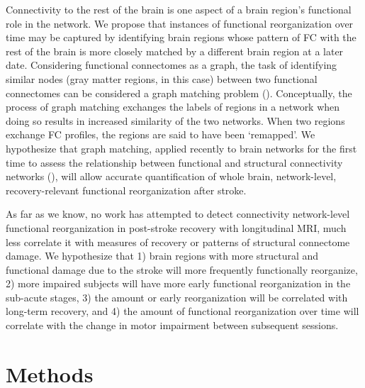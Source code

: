 \documentclass[phd,tocprelim]{cornell}
\begin{document}
	Connectivity to the rest of the brain is one aspect of a brain region's functional role in the network. We propose that instances of functional reorganization over time may be captured by identifying brain regions whose pattern of FC with the rest of the brain is more closely matched by a different brain region at a later date. Considering functional connectomes as a graph, the task of identifying similar nodes (gray matter regions, in this case) between two functional connectomes can be considered a graph matching problem (\cite{Conte2004-ro}). Conceptually, the process of graph matching exchanges the labels of regions in a network when doing so results in increased similarity of the two networks. When two regions exchange FC profiles, the regions are said to have been ‘remapped’. We hypothesize that graph matching, applied recently to brain networks for the first time to assess the relationship between functional and structural connectivity networks (\cite{Osmanlioglu2019-ao}), will allow accurate quantification of whole brain, network-level, recovery-relevant functional reorganization after stroke. 	
	
	As far as we know, no work has attempted to detect connectivity network-level functional reorganization in post-stroke recovery with longitudinal MRI, much less correlate it with measures of recovery or patterns of structural connectome damage. We hypothesize that 1) brain regions with more structural and functional damage due to the stroke  will more frequently functionally reorganize, 2) more impaired subjects will have more early functional reorganization in the sub-acute stages, 3) the amount or early reorganization will be correlated with long-term recovery, and 4) the amount of functional reorganization over time will correlate with the change in motor impairment between subsequent sessions.	
	
\section{Methods}
\end{document}

